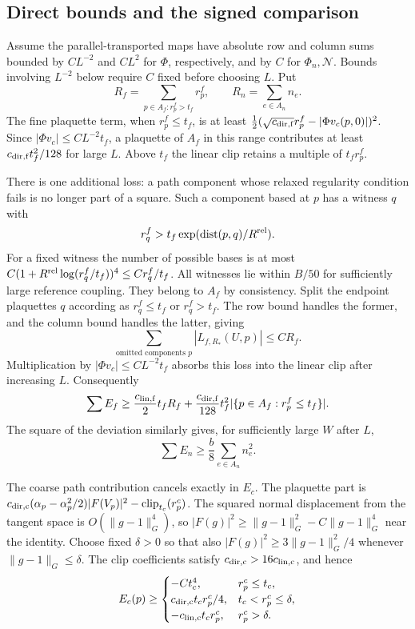 \subsection{Direct bounds and the signed comparison}

Assume the parallel-transported maps have absolute row and column sums bounded by
$CL^{-2}$ and $CL^2$ for $\Phi$, respectively, and by $C$ for
$\Phi_n,\mathcal N$. Bounds involving $L^{-2}$ below require $C$ fixed
before choosing $L$. Put
\[
 R_f=\sum_{p\in A_f:r_p^f>t_f}r_p^f,
 \qquad R_n=\sum_{e\in A_n}n_e.
\]
The fine plaquette term, when $r_p^f\le t_f$, is at least
$\tfrac12(\sqrt{c_{\rm dir,f}}r_p^f-|\Phi v_c(p,0)|)^2$.
Since $|\Phi v_c|\le CL^{-2}t_f$, a plaquette of $A_f$ in this range
contributes at least $c_{\rm dir,f}t_f^2/128$ for large $L$.
Above $t_f$ the linear clip retains a multiple of $t_fr_p^f$.

There is one additional loss: a path component whose relaxed regularity condition fails is no
longer part of a square. Such a component based at $p$ has a witness $q$ with
\[
 r_q^f>t_f\exp(\operatorname{dist}(p,q)/R^{\rm rel}).
\]
For a fixed witness the number of possible bases is at most
$C(1+R^{\rm rel}\log(r_q^f/t_f))^4\le C r_q^f/t_f$.
All witnesses lie within $B/50$ for sufficiently large reference coupling.
They belong to $A_f$ by consistency. Split the endpoint plaquettes $q$ according as $r_q^f\le t_f$ or $r_q^f>t_f$. The row bound handles
the former, and the column bound handles the latter, giving
\[
 \sum_{\text{omitted components }p}|L_{f,R_*}(U,p)|\le C R_f.
\]
Multiplication by $|\Phi v_c|\le CL^{-2}t_f$ absorbs this loss into the
linear clip after increasing $L$. Consequently
\begin{equation}
 \sum E_f\ge\frac{c_{\rm lin,f}}2 t_fR_f
  +\frac{c_{\rm dir,f}}{128}t_f^2
                         |\{p\in A_f:r_p^f\le t_f\}|.
 \label{ch06:fine-bound}
\end{equation}
The square of the deviation similarly gives, for sufficiently large $W$ after $L$,
\begin{equation}
 \sum E_n\ge\frac b8\sum_{e\in A_n}n_e^2.
 \label{ch06:mismatch-bound}
\end{equation}

The coarse path contribution cancels exactly in $E_c$. The plaquette part is
$c_{\rm dir,c}(\alpha_p-\alpha_p^2/2)|F(V_p)|^2
-\operatorname{clip}_{t_c}(r_p^c)$.
The squared normal displacement from the tangent space is $O(\|g-1\|_G^4)$,
so $|F(g)|^2\ge\|g-1\|_G^2-C\|g-1\|_G^4$ near the identity. Choose fixed
$\delta>0$ so that also $|F(g)|^2\ge3\|g-1\|_G^2/4$ whenever $\|g-1\|_G\le\delta$.
The clip coefficients satisfy $c_{\rm dir,c}>16c_{\rm lin,c}$, and hence
\begin{equation}
 E_c(p)\ge
 \begin{cases}
 -Ct_c^4,&r_p^c\le t_c,\\
 c_{\rm dir,c}t_cr_p^c/4,&t_c<r_p^c\le\delta,\\
 -c_{\rm lin,c}t_cr_p^c,&r_p^c>\delta.
 \end{cases}
 \label{ch06:coarse-bound}
\end{equation}

